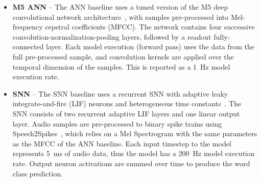     \begin{itemize}
        \item \textbf{M5 ANN} -- The ANN baseline uses a tuned version of the M5 deep convolutional network architecture~\cite{dai2016deep}, with samples pre-processed into Mel-frequency cepstral coefficients (MFCC). The network contains four successive convolution-normalization-pooling layers, followed by a readout fully-connected layer. Each model execution (forward pass) uses the data from the full pre-processed sample, and convolution kernels are applied over the temporal dimension of the samples. This is reported as a 1~Hz model execution rate.

        \item \textbf{SNN} -- The SNN baseline uses a recurrent SNN with adaptive leaky integrate-and-fire (LIF) neurons and heterogeneous time constants~\cite{bittar22surrogate}. The SNN consists of two recurrent adaptive LIF layers and one linear output layer.
        Audio samples are pre-processed to binary spike trains using Speech2Spikes~\cite{stewart23speech2spikes}, which relies on a Mel Spectrogram with the same parameters as the MFCC of the ANN baseline. Each input timestep to the model represents 5~ms of audio data, thus the model has a 200~Hz model execution rate. Output neuron activations are summed over time to produce the word class prediction.
    \end{itemize}



